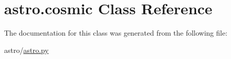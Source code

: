 \hypertarget{classastro_1_1cosmic}{}\section{astro.\+cosmic Class Reference}
\label{classastro_1_1cosmic}


The documentation for this class was generated from the following file\+:\begin{DoxyCompactItemize}
\item 
astro/\hyperlink{astro_8py}{astro.\+py}\end{DoxyCompactItemize}

